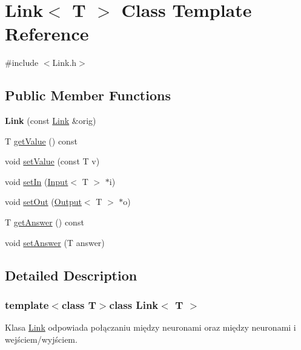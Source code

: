 \hypertarget{class_link}{\section{\-Link$<$ \-T $>$ \-Class \-Template \-Reference}
\label{class_link}
}


{\ttfamily \#include $<$\-Link.\-h$>$}

\subsection*{\-Public \-Member \-Functions}
\begin{DoxyCompactItemize}
\item 
\hypertarget{class_link_a3db35b41536e89e49429c87ef7ae9741}{{\bfseries \-Link} (const \hyperlink{class_link}{\-Link} \&orig)}\label{class_link_a3db35b41536e89e49429c87ef7ae9741}

\item 
\-T \hyperlink{class_link_aff003e24a4024d3f8b72ad43a7ca0f05}{get\-Value} () const 
\item 
void \hyperlink{class_link_ac767dbf3f0e020e3f08fa4ac8bc77fcd}{set\-Value} (const \-T v)
\item 
void \hyperlink{class_link_a7f530e21b1307f5cc361095e85ed8cfb}{set\-In} (\hyperlink{class_input}{\-Input}$<$ \-T $>$ $\ast$i)
\item 
void \hyperlink{class_link_a0ee7aaa6776c87de94483c4db508acd7}{set\-Out} (\hyperlink{class_output}{\-Output}$<$ \-T $>$ $\ast$o)
\item 
\-T \hyperlink{class_link_a5a670e48e85fbf0a03ab2907f147db75}{get\-Answer} () const 
\item 
void \hyperlink{class_link_ab4c5011d91f54ff6aacc31a7d100e209}{set\-Answer} (\-T answer)
\end{DoxyCompactItemize}


\subsection{\-Detailed \-Description}
\subsubsection*{template$<$class \-T$>$class Link$<$ T $>$}

\-Klasa \hyperlink{class_link}{\-Link} odpowiada połączaniu między neuronami oraz między neuronami i wejściem/wyjściem. 

